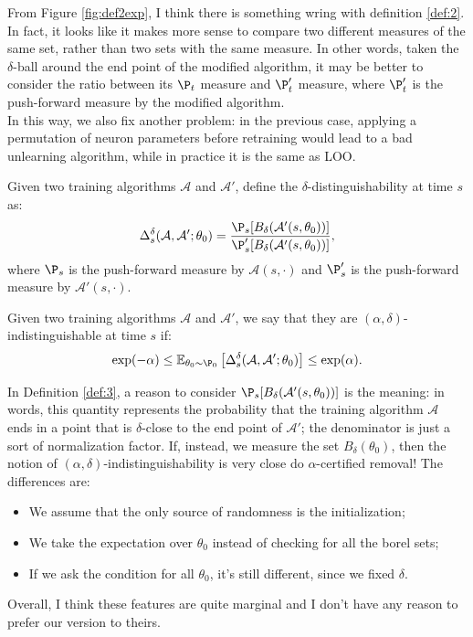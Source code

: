 From Figure \ref{fig:def2exp}, I think there is something wring with definition \ref{def:2}. In fact, it looks like it makes more sense to compare two different measures of the same set, rather than two sets with the same measure.
In other words, taken the $\delta$-ball around the end point of the modified algorithm, it may be better to consider the ratio between its $\P_t$ measure and $\P'_t$ measure, where $\P'_t$ is the push-forward measure by the modified algorithm.\\
In this way, we also fix another problem: in the previous case, applying a permutation of neuron parameters before retraining would lead to a bad unlearning algorithm, while in practice it is the same as LOO. 
\begin{definition*}\label{def:3}
    Given two training algorithms $\mathcal{A}$ and $\mathcal{A}'$, define the $\delta$-distinguishability at time $s$ as:
    $$ \Delta^\delta_s(\mathcal{A},\mathcal{A'};\theta_0) = \frac{\P_s[B_\delta(\mathcal{A}'(s,\theta_0))]}{\P_s'[B_\delta(\mathcal{A}'(s,\theta_0))]}, $$
    where $\P_s$ is the push-forward measure by $\mathcal{A}(s,\cdot)$ and $\P_s'$ is the push-forward measure by $\mathcal{A}'(s,\cdot)$.
\end{definition*}

\begin{definition*}
    Given two training algorithms $\mathcal{A}$ and $\mathcal{A}'$, we say that they are $(\alpha,\delta)$-indistinguishable at time $s$ if:
    $$ \exp(-\alpha)\leq \mathbb{E}_{\theta_0\sim\P_0}\left[\Delta^\delta_s(\mathcal{A},\mathcal{A'};\theta_0)\right] \le \exp(\alpha). $$
\end{definition*}


\begin{remark}
  In Definition \ref{def:3}, a reason to consider $\P_s[B_\delta(\mathcal{A}'(s,\theta_0))]$ is the meaning: in words, this quantity represents the probability that the training algorithm $\mathcal{A}$ ends in a point that is $\delta$-close to the end point of $\mathcal{A}'$; the denominator is just a sort of normalization factor.
  If, instead, we measure the set $B_\delta(\theta_0)$, then the notion of $(\alpha,\delta)$-indistinguishability is very close do $\alpha$-certified removal!
  The differences are:
  \begin{itemize}
    \item We assume that the only source of randomness is the initialization;
    \item We take the expectation over $\theta_0$ instead of checking for all the borel sets;
    \item If we ask the condition for all $\theta_0$, it's still different, since we fixed $\delta$.
  \end{itemize} 
  Overall, I think these features are quite marginal and I don't have any reason to prefer our version to theirs.
\end{remark}


